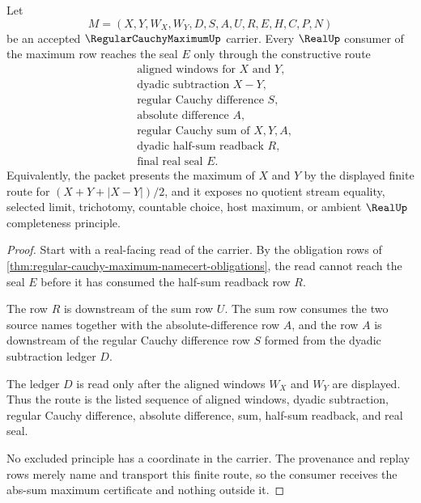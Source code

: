 \begin{theorem}\label{thm:regular-cauchy-maximum-abs-sum-route}
Let
$$
M=(X,Y,W_X,W_Y,D,S,A,U,R,E,H,C,P,N)
$$
be an accepted $\RegularCauchyMaximumUp$ carrier. Every $\RealUp$ consumer of the maximum row reaches the seal $E$ only through the constructive route
$$
\begin{aligned}
&\text{aligned windows for }X\text{ and }Y,\\
&\text{dyadic subtraction }X-Y,\\
&\text{regular Cauchy difference }S,\\
&\text{absolute difference }A,\\
&\text{regular Cauchy sum of }X,Y,A,\\
&\text{dyadic half-sum readback }R,\\
&\text{final real seal }E.
\end{aligned}
$$
Equivalently, the packet presents the maximum of $X$ and $Y$ by the displayed finite route for $(X+Y+|X-Y|)/2$, and it exposes no quotient stream equality, selected limit, trichotomy, countable choice, host maximum, or ambient $\RealUp$ completeness principle.
\end{theorem}
\begin{proof}
Start with a real-facing read of the carrier. By the obligation rows of \autoref{thm:regular-cauchy-maximum-namecert-obligations}, the read cannot reach the seal $E$ before it has consumed the half-sum readback row $R$.

The row $R$ is downstream of the sum row $U$. The sum row consumes the two source names together with the absolute-difference row $A$, and the row $A$ is downstream of the regular Cauchy difference row $S$ formed from the dyadic subtraction ledger $D$.

The ledger $D$ is read only after the aligned windows $W_X$ and $W_Y$ are displayed. Thus the route is the listed sequence of aligned windows, dyadic subtraction, regular Cauchy difference, absolute difference, sum, half-sum readback, and real seal.

No excluded principle has a coordinate in the carrier. The provenance and replay rows merely name and transport this finite route, so the consumer receives the abs-sum maximum certificate and nothing outside it.
\end{proof}


